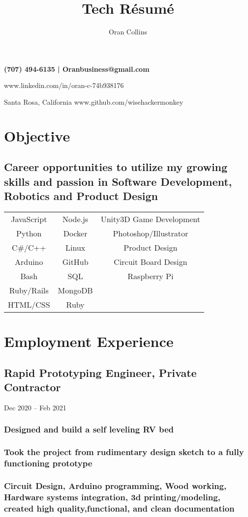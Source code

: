 \documentclass{article}
\makeatletter
\renewcommand{\maketitle}{
\begin{flushleft}
\bfseries
{\Huge\theauthor}\hfill
(707) 494-6135 |  Oranbusiness@gmail.com

\hfill www.linkedin.com/in/oran-c-74b938176

{\hspace{1mm}Santa Rosa, California}\hfill 
www.github.com/wisehackermonkey

\end{flushleft}
}
\makeatother
\begin{document}
\title{Tech R\'esum\'e}
\author{Oran Collins}


\maketitle
\section{Objective}
    \subsection{Career opportunities to utilize my growing skills and passion in Software Development, Robotics and Product Design}
\begin{flushleft}

 \begin{tabular}{ |c|c|c| }
 \hline
JavaScript & Node.js & Unity3D Game Development\\
Python & Docker & Photoshop/Illustrator  \\
C\#/C++ & Linux & Product Design \\
Arduino & GitHub & Circuit Board Design \\
Bash & SQL & Raspberry Pi \\
Ruby/Rails & MongoDB &   \\
HTML/CSS &  Ruby  &   \\
\hline
\end{tabular}
\end{flushleft}
\section{Employment Experience}
     \subsection{Rapid Prototyping Engineer, Private Contractor} Dec 2020 – Feb 2021
        
        \vspace{-2mm}
    	\subsubsection{Designed and build a self leveling RV bed}
    	\subsubsection{Took the project from rudimentary design sketch to a fully functioning prototype}
    	\subsubsection{Circuit Design, Arduino programming, Wood working, Hardware systems integration, 3d printing/modeling, created high quality,functional, and clean documentation}
    	
\end{document}
